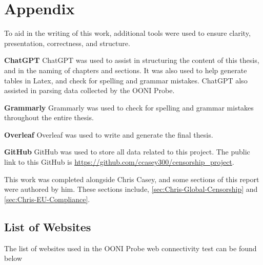 \chapter{Appendix}

To aid in the writing of this work, additional tools were used to ensure clarity, presentation, correctness, and structure.

\textbf{ChatGPT} ChatGPT was used to assist in structuring the content of this thesis, and in the naming of chapters and sections. It was also used to help generate tables in Latex, and check for spelling and grammar mistakes. ChatGPT also assisted in parsing data collected by the OONI Probe.

\textbf{Grammarly} Grammarly was used to check for spelling and grammar mistakes throughout the entire thesis.

\textbf{Overleaf} Overleaf was used to write and generate the final thesis.

\textbf{GitHub} GitHub was used to store all data related to this project. The public link to this GitHub is \url{https://github.com/ccasey300/censorship_project}.

This work was completed alongside Chris Casey, and some sections of this report were authored by him. These sections include, \ref{sec:Chris-Global-Censorship} and \ref{sec:Chris-EU-Compliance}.

\section{List of Websites}

The list of websites used in the OONI Probe web connectivity test can be found below

